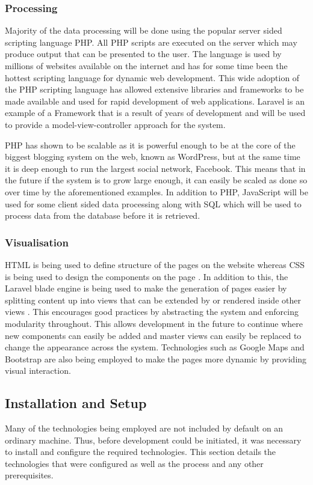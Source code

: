 \subsubsection{Processing}
Majority of the data processing will be done using the popular server sided scripting language PHP. All PHP scripts are executed on the server which may produce output that can be presented to the user. The language is used by millions of websites available on the internet and has for some time been the hottest scripting language for dynamic web development. This wide adoption of the PHP scripting language has allowed extensive libraries and frameworks to be made available and used for rapid development of web applications. Laravel is an example of a Framework that is a result of years of development and will be used to provide a model-view-controller approach for the system.

PHP has shown to be scalable as it is powerful enough to be at the core of the biggest blogging system on the web, known as WordPress, but at the same time it is deep enough to run the largest social network, Facebook\cite{W3Schools:PHP_Intro, Wiki:WordPress, Fastcompany:Facebook_PHP}. This means that in the future if the system is to grow large enough, it can easily be scaled as done so over time by the aforementioned examples. In addition to PHP, JavaScript will be used for some client sided data processing along with SQL which will be used to process data from the database before it is retrieved.

\subsubsection{Visualisation}
HTML is being used to define structure of the pages on the website whereas CSS is being used to design the components on the page \cite{W3:HTML5, W3:CSS}. In addition to this, the Laravel blade engine is being used to make the generation of pages easier by splitting content up into views that can be extended by  or rendered inside other views \cite{Laravel:Blade}. This encourages good practices by abstracting the system and enforcing modularity throughout. This allows development in the future to continue where new components can easily be added and master views can easily be replaced to change the appearance across the system. Technologies such as Google Maps and Bootstrap are also being employed to make the pages more dynamic by providing visual interaction.

\subsection{Installation and Setup}
Many of the technologies being employed are not included by default on an ordinary machine. Thus, before development could be initiated, it was necessary to install and configure the required technologies. This section details the technologies that were configured as well as the process and any other prerequisites.

